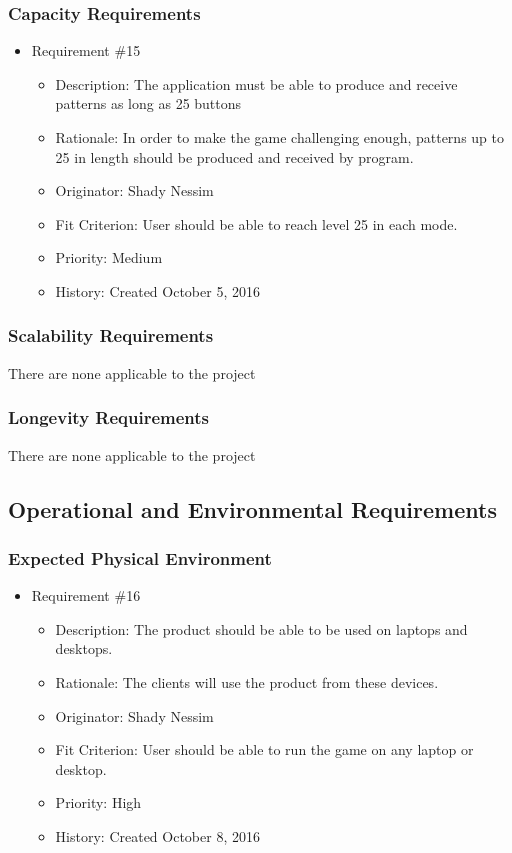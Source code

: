 \documentclass[12pt, titlepage]{article}
\begin{document}
\subsubsection{Capacity Requirements}
\begin{itemize}

\item Requirement \#15 
\begin{itemize} 
\item Description: The application must be able to produce and receive patterns as long as 25 buttons
\item Rationale: In order to make the game challenging enough, patterns up to 25 in length should be produced and received by program.
\item Originator: Shady Nessim 
\item Fit Criterion: User should be able to reach level 25 in each mode.
\item Priority: Medium 
\item History: Created October 5, 2016
\end{itemize}

\end{itemize}

\subsubsection{Scalability Requirements}
There are none applicable to the project

\subsubsection{Longevity Requirements}
There are none applicable to the project

\subsection{Operational and Environmental Requirements}
\subsubsection{Expected Physical Environment}
\begin{itemize}

\item Requirement \#16
\begin{itemize} 
\item Description: The product should be able to be used on laptops and desktops. 
\item Rationale: The clients will use the product from these devices.
\item Originator: Shady Nessim 
\item Fit Criterion: User should be able to run the game on any laptop or desktop.
\item Priority: High 
\item History: Created October 8, 2016
\end{itemize}

\end{itemize}
\end{document}
